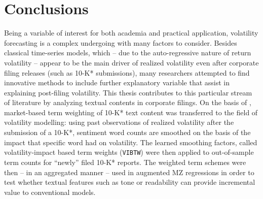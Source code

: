 \section{Conclusions}
\label{sec: conclusion}
Being a variable of interest for both academia and practical application, volatility forecasting is a complex undergoing with many factors to consider. Besides classical time-series models, which -- due to the auto-regressive nature of return volatility -- appear to be the main driver of realized volatility even after corporate filing releases (such as 10-K* submissions), many researchers attempted to find innovative methods to include further explanatory variable that assist in explaining post-filing volatility. This thesis contributes to this particular stream of literature by analyzing textual contents in corporate filings. On the basis of \textcite{Jegadeesh2013}, market-based term weighting of 10-K* text content was transferred to the field of volatility modelling: using past observations of realized volatility after the submission of a 10-K*, sentiment word counts are smoothed on the basis of the impact that specific word had on volatility. The learned smoothing factors, called volatility-impact based term weights (\texttt{VIBTW}) were then applied to out-of-sample term counts for \enquote{newly} filed 10-K* reports. The weighted term schemes were then -- in an aggregated manner -- used in augmented MZ regressions in order to test whether textual features such as tone or readability can provide incremental value to conventional models.

